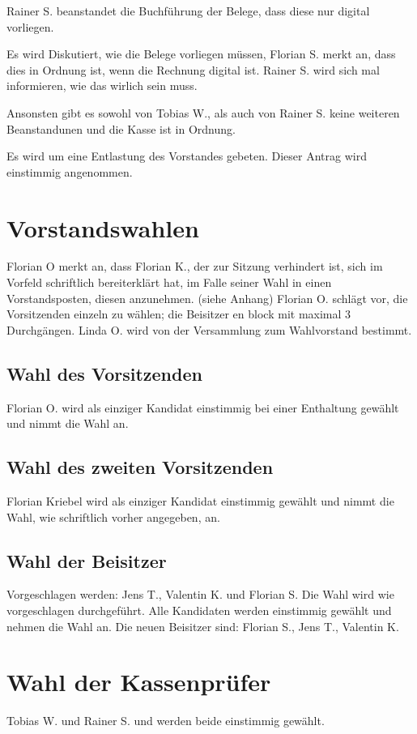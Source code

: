 Rainer S. beanstandet die Buchführung der Belege, dass diese nur digital vorliegen.

Es wird Diskutiert, wie die Belege vorliegen müssen, Florian S. merkt an, dass dies in Ordnung ist, wenn die Rechnung digital ist. Rainer S. wird sich mal informieren, wie das wirlich sein muss.

Ansonsten gibt es sowohl von Tobias W., als auch von Rainer S. keine weiteren Beanstandunen und die Kasse ist in Ordnung.

Es wird um eine Entlastung des Vorstandes gebeten.
Dieser Antrag wird einstimmig angenommen.

\section{Vorstandswahlen}
 Florian O merkt an, dass Florian K., der zur Sitzung verhindert ist, sich im Vorfeld schriftlich bereiterklärt hat, im Falle seiner Wahl in einen Vorstandsposten, diesen anzunehmen. (siehe Anhang)
 Florian O. schlägt vor, die Vorsitzenden einzeln zu wählen; die Beisitzer en block mit maximal 3 Durchgängen.
 Linda O. wird von der Versammlung zum Wahlvorstand bestimmt.
\subsection{Wahl des Vorsitzenden}
 Florian O. wird als einziger Kandidat einstimmig bei einer Enthaltung gewählt und nimmt die Wahl an. 
\subsection{Wahl des zweiten Vorsitzenden}         
 Florian Kriebel wird als einziger Kandidat einstimmig gewählt und nimmt die Wahl, wie schriftlich vorher angegeben, an. 
\subsection{Wahl der Beisitzer}
  Vorgeschlagen werden: Jens T., Valentin K. und Florian S.
  Die Wahl wird wie vorgeschlagen durchgeführt. 
  Alle Kandidaten werden einstimmig gewählt und nehmen die Wahl an. 
  Die neuen Beisitzer sind: Florian S., Jens T., Valentin K.

\section{Wahl der Kassenprüfer}
 Tobias W. und Rainer S. und werden beide einstimmig gewählt. 
 

